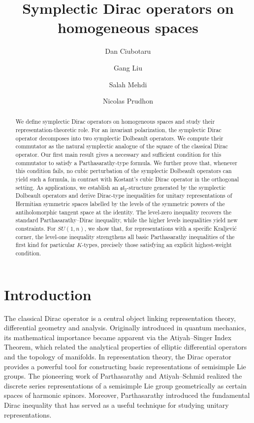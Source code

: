 \documentclass{amsart}[draft,11pt]
\title[Symplectic Dirac operators on homogeneous spaces]{Symplectic Dirac operators on homogeneous spaces}
\author
{Dan Ciubotaru}
\author{Gang Liu}
\author{Salah Mehdi}
\author{Nicolas Prudhon}
\numberwithin{equation}{section}
\theoremstyle{definition}
\begin{document}
\maketitle

\begin{abstract}
We define symplectic Dirac operators on homogeneous spaces and study their representation-theoretic role. For an invariant polarization, the symplectic Dirac operator decomposes into two symplectic Dolbeault operators. We compute their commutator as the natural symplectic analogue of the square of the classical Dirac operator. Our first main result gives a necessary and sufficient condition for this commutator to satisfy a Parthasarathy-type formula. We further prove that, whenever this condition fails, no cubic perturbation of the symplectic Dolbeault operators can yield such a formula, in contrast with Kostant’s cubic Dirac operator in the orthogonal setting. As applications, we establish an $\mathfrak{sl}_2$-structure generated by the symplectic Dolbeault operators and derive Dirac-type inequalities for unitary representations of Hermitian symmetric spaces labelled by the levels of the symmetric powers of the antiholomorphic tangent space at the identity. The level-zero inequality recovers the standard Parthasarathy–Dirac inequality, while the higher levels inequalities yield new constraints. For $SU(1,n)$, we show that, for representations with a specific Kraljevi\'c corner, the level-one inequality strengthens all basic Parthasarathy inequalities of the first kind for particular $K$-types, precisely those satisfying an explicit highest-weight condition.
\end{abstract}

\section*{Introduction}
The classical Dirac operator is a central object linking representation theory, differential geometry and analysis. Originally introduced in quantum mechanics, its mathematical importance became apparent via the Atiyah--Singer Index Theorem, which related the analytical properties of elliptic differential operators and the topology of manifolds. In representation theory, the Dirac operator provides a powerful tool for constructing basic representations of semisimple Lie groups. The pioneering work of Parthasarathy and Atiyah--Schmid realized the discrete series representations of a semisimple Lie group geometrically as certain spaces of harmonic spinors. Moreover, Parthasarathy introduced the fundamental Dirac inequality that has served as a useful technique for studying unitary representations.
\end{document}
